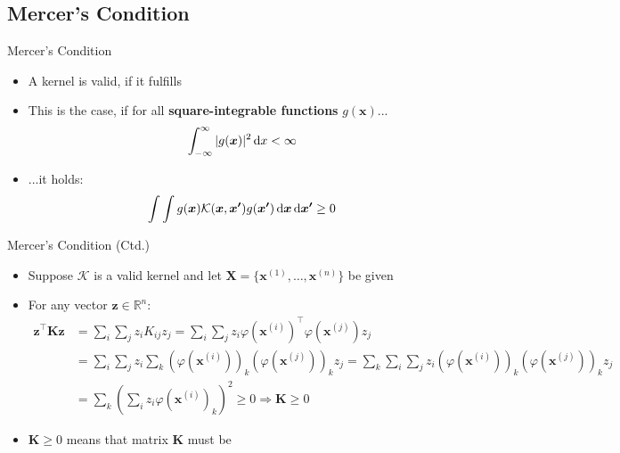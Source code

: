 \subsection{Mercer's Condition}

\begin{frame}{Mercer's Condition}{}
	\begin{itemize}
		\item A kernel is valid, if it fulfills 
		\item This is the case, if for all \textbf{square-integrable functions} $g(\bm{x})$...
		\begin{equation}
			\int_{-\infty}^{\infty} \vert g(\bm{x}) \vert^2 \mathop{}\!\mathrm{d} x < \infty
		\end{equation}
		\item ...it holds:
		\begin{equation}
			\int \int g(\bm{x})\mathcal{K}(\bm{x}, \bm{x'})g(\bm{x'}) \mathop{}\!\mathrm{d} \bm{x} \mathop{}\!\mathrm{d} \bm{x'} \ge 0
		\end{equation}
	\end{itemize}
\end{frame}


\begin{frame}{Mercer's Condition (Ctd.)}{}\optional
	\begin{itemize}
		\item Suppose $\mathcal{K}$ is a valid kernel and let $\bm{X} = \{\bm{x}^{(1)}, \dots, \bm{x}^{(n)}\}$ be given
		\item For any vector $\bm{z} \in \mathbb{R}^n$:
		\vspace*{-1.5mm}
		\scriptsize
		\begin{align}
			\bm{z}^{\intercal} \bm{K} \bm{z}
				&= 	\sum_i \sum_j z_i K_{ij} z_j
						= \sum_i \sum_j z_i \varphi(\bm{x}^{(i)})^{\intercal} \varphi(\bm{x}^{(j)}) z_j 			\\
				&= \sum_i \sum_j z_i \sum_k (\varphi(\bm{x}^{(i)}))_k (\varphi(\bm{x}^{(j)}))_k z_j 
						= \sum_k \sum_i \sum_j z_i (\varphi(\bm{x}^{(i)}))_k (\varphi(\bm{x}^{(j)}))_k z_j 		\\
				&= \sum_k \left( \sum_i z_i \varphi(\bm{x}^{(i)})_k \right)^2 \ge 0 \Longrightarrow \bm{K} \ge 0
		\end{align}
		\normalsize
		\item $\bm{K} \ge 0$ means that matrix $\bm{K}$ must be 
	\end{itemize}
\end{frame}


